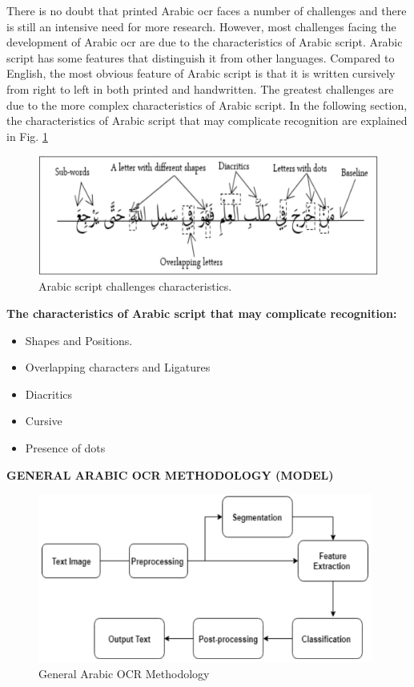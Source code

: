 There is no doubt that printed Arabic \acrshort{ocr} faces a number of challenges and there is still an intensive need for more research. However, most challenges facing the development of Arabic \acrshort{ocr} are due to the characteristics of Arabic script. Arabic script has some features that distinguish it from other languages. Compared to English, the most obvious feature of Arabic script is that it is written cursively from right to left in both printed and handwritten. The greatest challenges are due to the more complex characteristics of Arabic script. In the following section, the characteristics of Arabic script that may complicate recognition are explained in Fig. \ref{fig:ocr2}

\begin{figure}[!htb]
    \centering
    \includegraphics[width=13cm]{images/ocr2.png}
    \caption{Arabic script challenges characteristics.}
    \label{fig:ocr2}
\end{figure}


\textbf{The characteristics of Arabic script that may complicate recognition:}
\begin{itemize}[itemsep=1pt, topsep=5pt]
    \item   Shapes and Positions.
    \item   Overlapping characters and Ligatures
    \item   Diacritics
    \item   Cursive
    \item   Presence of dots
\end{itemize}  

\textbf{GENERAL ARABIC OCR METHODOLOGY (MODEL)}
\begin{figure}[H]
    \centering
    \includegraphics[width=11cm]{images/ocr3.png}
    \caption{General Arabic OCR Methodology}
    \label{fig:ocr3}
\end{figure}

